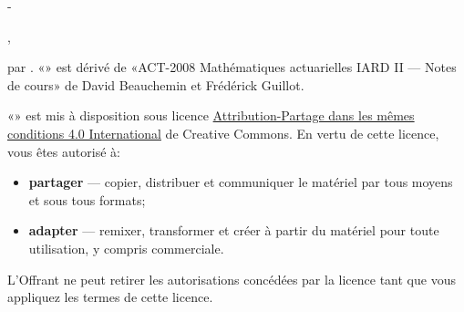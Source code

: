 
\begingroup
\calccentering{\unitlength}
\begin{adjustwidth*}{\unitlength}{-\unitlength}
  \setlength{\parindent}{0pt}
  \setlength{\parskip}{\baselineskip}
  \small

  {\theauthor}, {\year}

  {\textcopyright} {\year} par {\theauthor}. «\thetitle» est dérivé de
  «ACT-2008 Mathématiques actuarielles IARD II --- Notes de cours» de
  David Beauchemin et Frédérick Guillot.

  «\thetitle» est mis à disposition sous licence
  \href{http://creativecommons.org/licenses/by-sa/4.0/deed.fr}{%
    Attri\-bu\-tion-Partage dans les mêmes conditions 4.0 International}
  de Creative Commons. En vertu de cette licence, vous êtes autorisé à:
  \begin{itemize}
  \item \textbf{partager} --- copier, distribuer et communiquer le
    matériel par tous moyens et sous tous formats;
  \item \textbf{adapter} --- remixer, transformer et créer à partir du
    matériel pour toute utilisation, y compris commerciale.
  \end{itemize}
  L'Offrant ne peut retirer les autorisations concédées par la licence
  tant que vous appliquez les termes de cette licence.


\end{adjustwidth*}
